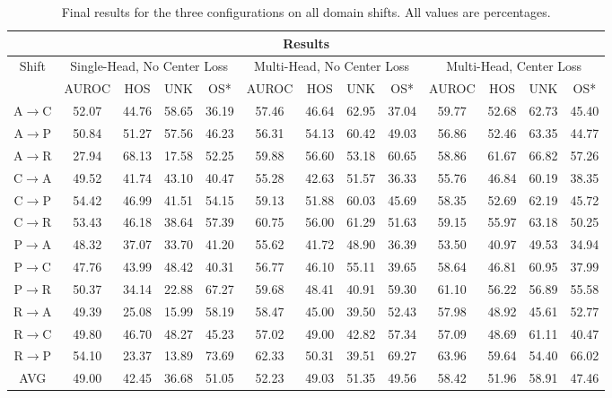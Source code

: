 \documentclass[10pt,twocolumn,letterpaper]{article}
\begin{document}
\begin{table}
  \centering
  \begin{tabular}[t]{||c||c|c|c|c||c|c|c|c||c|c|c|c||}
    \hline
    \multicolumn{13}{||c||}{Results} \\
    \hline
    \multirow{2}{*}{Shift}   & \multicolumn{4}{|c||}{Single-Head, No Center Loss} & \multicolumn{4}{|c||}{Multi-Head, No Center Loss} & \multicolumn{4}{|c||}{Multi-Head, Center Loss} \\
            & AUROC & HOS   & UNK   & OS*   & AUROC & HOS   & UNK   & OS*   & AUROC & HOS   & UNK   & OS*   \\
    \hline
    A$\to$C & 52.07 & 44.76 & 58.65 & 36.19 & 57.46 & 46.64 & 62.95 & 37.04 & 59.77 & 52.68 & 62.73 & 45.40 \\
    A$\to$P & 50.84 & 51.27 & 57.56 & 46.23 & 56.31 & 54.13 & 60.42 & 49.03 & 56.86 & 52.46 & 63.35 & 44.77 \\
    A$\to$R & 27.94 & 68.13 & 17.58 & 52.25 & 59.88 & 56.60 & 53.18 & 60.65 & 58.86 & 61.67 & 66.82 & 57.26 \\
    C$\to$A & 49.52 & 41.74 & 43.10 & 40.47 & 55.28 & 42.63 & 51.57 & 36.33 & 55.76 & 46.84 & 60.19 & 38.35 \\
    C$\to$P & 54.42 & 46.99 & 41.51 & 54.15 & 59.13 & 51.88 & 60.03 & 45.69 & 58.35 & 52.69 & 62.19 & 45.72 \\
    C$\to$R & 53.43 & 46.18 & 38.64 & 57.39 & 60.75 & 56.00 & 61.29 & 51.63 & 59.15 & 55.97 & 63.18 & 50.25 \\
    P$\to$A & 48.32 & 37.07 & 33.70 & 41.20 & 55.62 & 41.72 & 48.90 & 36.39 & 53.50 & 40.97 & 49.53 & 34.94 \\
    P$\to$C & 47.76 & 43.99 & 48.42 & 40.31 & 56.77 & 46.10 & 55.11 & 39.65 & 58.64 & 46.81 & 60.95 & 37.99 \\
    P$\to$R & 50.37 & 34.14 & 22.88 & 67.27 & 59.68 & 48.41 & 40.91 & 59.30 & 61.10 & 56.22 & 56.89 & 55.58 \\
    R$\to$A & 49.39 & 25.08 & 15.99 & 58.19 & 58.47 & 45.00 & 39.50 & 52.43 & 57.98 & 48.92 & 45.61 & 52.77 \\
    R$\to$C & 49.80 & 46.70 & 48.27 & 45.23 & 57.02 & 49.00 & 42.82 & 57.34 & 57.09 & 48.69 & 61.11 & 40.47 \\
    R$\to$P & 54.10 & 23.37 & 13.89 & 73.69 & 62.33 & 50.31 & 39.51 & 69.27 & 63.96 & 59.64 & 54.40 & 66.02 \\
    \hline
    AVG     & 49.00 & 42.45 & 36.68 & 51.05 & 52.23 & 49.03 & 51.35 & 49.56 & 58.42 & 51.96 & 58.91 & 47.46 \\ 
    \hline
  \end{tabular}
  \caption{\centering\label{tab:results}Final results for the three configurations on all domain shifts. All values are percentages.}
\end{table}
\end{document}
